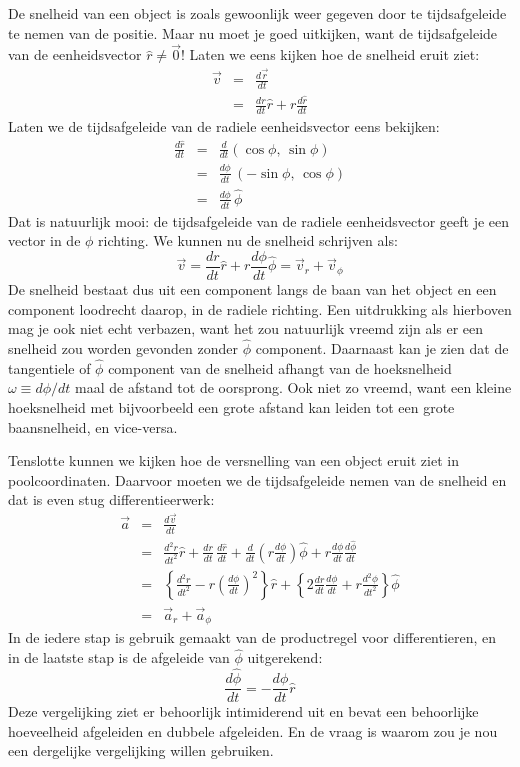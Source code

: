 De snelheid van een object is zoals gewoonlijk weer gegeven door
te tijdsafgeleide te nemen van de positie. Maar nu moet je goed uitkijken, want
de tijdsafgeleide van de eenheidsvector $\hat{r}\neq\vec{0}$! Laten we eens kijken
hoe de snelheid eruit ziet:
\begin{eqnarray}
\vec{v} &=& \frac{d\vec{r}}{dt} \\
& = & \frac{dr}{dt} \hat{r} + r \frac{d\hat{r}}{dt}
\end{eqnarray} 
Laten we de tijdsafgeleide van de radiele eenheidsvector eens bekijken:
\begin{eqnarray}
\frac{d\hat{r}}{dt} & = & \frac{d}{dt}(\cos\phi,\,\sin\phi) \\
& = & \frac{d\phi}{dt}\,(-\sin\phi,\,\cos\phi) \\
& = & \frac{d\phi}{dt}\,\hat{\phi}
\end{eqnarray}
Dat is natuurlijk mooi: de tijdsafgeleide van de radiele eenheidsvector geeft
je een vector in de $\phi$ richting. We kunnen nu de snelheid schrijven als:
\begin{equation}\label{eq:vpool}
\vec{v} = \frac{dr}{dt} \hat{r} + r\frac{d\phi}{dt} \hat{\phi} = \vec{v}_{r}+\vec{v}_{\phi}
\end{equation}
De snelheid bestaat dus uit een component langs de baan van het object en
een component loodrecht daarop, in de radiele richting. Een uitdrukking als
hierboven mag je ook niet echt verbazen, want het zou natuurlijk vreemd zijn
als er een snelheid zou worden gevonden zonder $\hat{\phi}$ component. 
Daarnaast kan je zien dat de tangentiele of $\hat{\phi}$ component van de
snelheid afhangt  van de hoeksnelheid $\omega\equiv d\phi / dt$ maal
de afstand tot de oorsprong. Ook niet zo vreemd, want een kleine hoeksnelheid
met bijvoorbeeld een grote afstand kan leiden tot een grote baansnelheid, en
vice-versa.

Tenslotte kunnen we kijken hoe de versnelling van een object eruit ziet in 
poolcoordinaten. Daarvoor moeten we de tijdsafgeleide nemen van de snelheid
en dat is even stug differentieerwerk:
\begin{eqnarray}
\vec{a} & = & \frac{d\vec{v}}{dt} \\
 & = & \frac{d^2r}{dt^2}\hat{r}  + \frac{dr}{dt}\,\frac{d\hat{r}}{dt} + \frac{d}{dt}\left(r\frac{d\phi}{dt}\right)\hat{\phi} + r\frac{d\phi}{dt}\frac{d\hat{\phi}}{dt} \\ 
 & = & \left\{\frac{d^2r}{dt^2}-r\left(\frac{d\phi}{dt}\right)^2\right\}\hat{r}+\left\{2\frac{dr}{dt}\frac{d\phi}{dt}+r\frac{d^2\phi}{dt^2}\right\}\hat{\phi}\label{eq:apool} \\
 & = & \vec{a}_{r}+\vec{a}_{\phi}
 \end{eqnarray}
 In de iedere stap is gebruik gemaakt van de productregel voor differentieren, en in de laatste stap is de 
 afgeleide van $\hat{\phi}$ uitgerekend:
 \begin{equation}
 \frac{d\hat{\phi}}{dt} = -\frac{d\phi}{dt}\hat{r}
 \end{equation}
Deze vergelijking ziet er behoorlijk intimiderend uit en bevat een behoorlijke hoeveelheid 
afgeleiden en dubbele afgeleiden. En de vraag is waarom zou je nou een dergelijke vergelijking 
willen gebruiken. 

